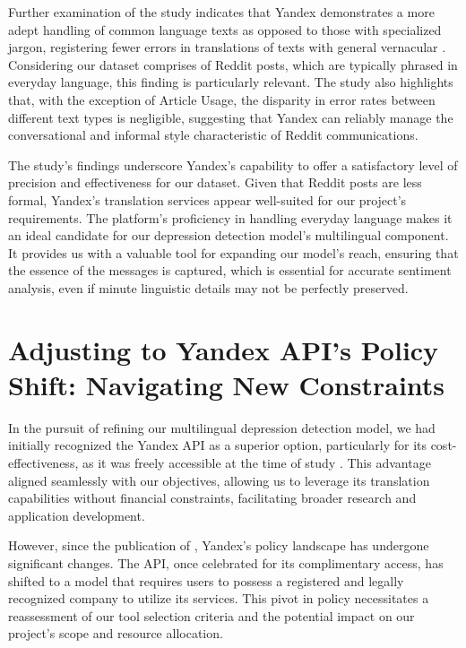 Further examination of the study indicates that Yandex demonstrates a more adept handling of common language texts as opposed to those with specialized jargon, registering fewer errors in translations of texts with general vernacular \cite{cambedda2021study}. Considering our dataset comprises of Reddit posts, which are typically phrased in everyday language, this finding is particularly relevant. The study also highlights that, with the exception of Article Usage, the disparity in error rates between different text types is negligible, suggesting that Yandex can reliably manage the conversational and informal style characteristic of Reddit communications.

The study’s findings underscore Yandex's capability to offer a satisfactory level of precision and effectiveness for our dataset. Given that Reddit posts are less formal, Yandex's translation services appear well-suited for our project's requirements. The platform’s proficiency in handling everyday language makes it an ideal candidate for our depression detection model's multilingual component. It provides us with a valuable tool for expanding our model’s reach, ensuring that the essence of the messages is captured, which is essential for accurate sentiment analysis, even if minute linguistic details may not be perfectly preserved.

\section{Adjusting to Yandex API's Policy Shift: Navigating New Constraints}

\quad In the pursuit of refining our multilingual depression detection model, we had initially recognized the Yandex API as a superior option, particularly for its cost-effectiveness, as it was freely accessible at the time of study \cite{rashmi2020comparison}. This advantage aligned seamlessly with our objectives, allowing us to leverage its translation capabilities without financial constraints, facilitating broader research and application development.

However, since the publication of \cite{rashmi2020comparison}, Yandex's policy landscape has undergone significant changes. The API, once celebrated for its complimentary access, has shifted to a model that requires users to possess a registered and legally recognized company to utilize its services. This pivot in policy necessitates a reassessment of our tool selection criteria and the potential impact on our project's scope and resource allocation.

